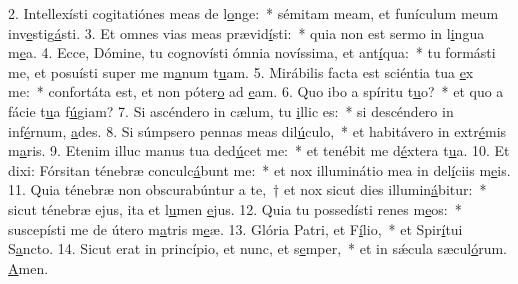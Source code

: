 2. Intellexísti cogitatiónes meas de l\uline{o}nge:~* sémitam meam, et funículum meum inv\uline{e}stig\uline{á}sti.
3. Et omnes vias meas prævid\uline{í}sti:~* quia non est sermo in l\uline{i}ngua m\uline{e}a.
4. Ecce, Dómine, tu cognovísti ómnia novíssima, et ant\uline{í}qua:~* tu formásti me, et posuísti super me m\uline{a}num t\uline{u}am.
5. Mirábilis facta est sciéntia tua \uline{e}x me:~* confortáta est, et non póter\uline{o} ad \uline{e}am.
6. Quo ibo a spíritu t\uline{u}o?~* et quo a fácie t\uline{u}a f\uline{ú}giam?
7. Si ascéndero in cælum, tu \uline{i}llic es:~* si descéndero in inf\uline{é}rnum, \uline{a}des.
8. Si súmpsero pennas meas dil\uline{ú}culo,~* et habitávero in extr\uline{é}mis m\uline{a}ris.
9. Etenim illuc manus tua ded\uline{ú}cet me:~* et tenébit me d\uline{é}xtera t\uline{u}a.
10. Et dixi: Fórsitan ténebræ conculc\uline{á}bunt me:~* et nox illuminátio mea in del\uline{í}ciis m\uline{e}is.
11. Quia ténebræ non obscurabúntur a te,~† et nox sicut dies illumin\uline{á}bitur:~* sicut ténebræ ejus, ita et l\uline{u}men \uline{e}jus.
12. Quia tu possedísti renes m\uline{e}os:~* suscepísti me de útero m\uline{a}tris m\uline{e}æ.
13. Glória Patri, et F\uline{í}lio,~* et Spir\uline{í}tui S\uline{a}ncto.
14. Sicut erat in princípio, et nunc, et s\uline{e}mper,~* et in sǽcula sæcul\uline{ó}rum. \uline{A}men.
